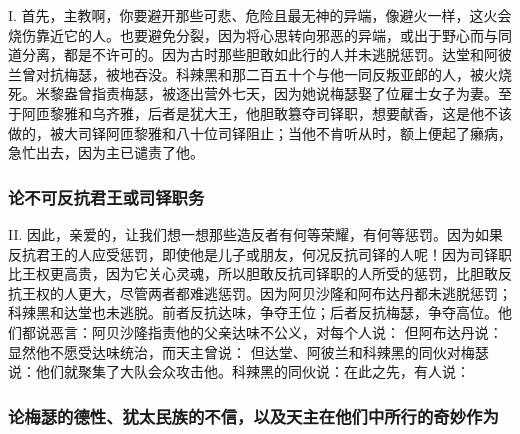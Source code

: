 I. 首先，主教啊，你要避开那些可悲、危险且最无神的异端，像避火一样，这火会烧伤靠近它的人。也要避免分裂，因为将心思转向邪恶的异端，或出于野心而与同道分离，都是不许可的。因为古时那些胆敢如此行的人并未逃脱惩罚。达堂和阿彼兰曾对抗梅瑟，被地吞没。科辣黑和那二百五十个与他一同反叛亚郎的人，被火烧死。米黎盎曾指责梅瑟，被逐出营外七天，因为她说梅瑟娶了位雇士女子为妻。至于阿匝黎雅和乌齐雅，后者是犹大王，他胆敢篡夺司铎职，想要献香，这是他不该做的，被大司铎阿匝黎雅和八十位司铎阻止；当他不肯听从时，额上便起了癞病，急忙出去，因为主已谴责了他。\par


\subsubsection{论不可反抗君王或司铎职务}

II. 因此，亲爱的，让我们想一想那些造反者有何等荣耀，有何等惩罚。因为如果反抗君王的人应受惩罚，即使他是儿子或朋友，何况反抗司铎的人呢！因为司铎职比王权更高贵，因为它关心灵魂，所以胆敢反抗司铎职的人所受的惩罚，比胆敢反抗王权的人更大，尽管两者都难逃惩罚。因为阿贝沙隆和阿布达丹都未逃脱惩罚；科辣黑和达堂也未逃脱。前者反抗达味，争夺王位；后者反抗梅瑟，争夺高位。他们都说恶言：阿贝沙隆指责他的父亲达味不公义，对每个人说： 但阿布达丹说： 显然他不愿受达味统治，而天主曾说： 但达堂、阿彼兰和科辣黑的同伙对梅瑟说：他们就聚集了大队会众攻击他。科辣黑的同伙说：在此之先，有人说：\par


\subsubsection{论梅瑟的德性、犹太民族的不信，以及天主在他们中所行的奇妙作为}

